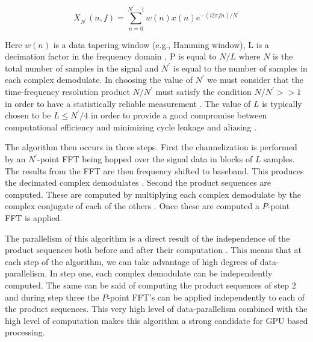 \begin{equation}
X_{N^\prime}(n,f) = \sum_{n=0}^{N^\prime - 1} w(n) x(n) e^{-(i 2 \pi f n)/N^\prime}
\label{eq:ComplexDemod}
\end{equation}

Here \begin{math}w(n)\end{math} is a data tapering window (e.g., Hamming window), L is a decimation factor in the frequency domain \cite{FenChenWan08}, P is equal to \begin{math}N / L \end{math} where $N$ is the total number of samples in the signal and $N^\prime$ is equal to the number of samples in each complex demodulate.  In choosing the value of \begin{math}N^\prime \end{math} we must consider that the time-frequency resolution product \begin{math}N/N^\prime\end{math} must satisfy the condition \begin{math}N/N^\prime >> 1\end{math} in order to have a statistically reliable measurement \cite{RobBroLoo91}.  The value of $L$ is typically chosen to be \begin{math}L \le N^\prime / 4\end{math} in order to provide a good compromise between computational efficiency and minimizing cycle leakage and aliasing \cite{RobBroLoo91}.

The algorithm then occurs in three steps.  First the channelization is performed by an $N^\prime$-point FFT being hopped over the signal data in blocks of $L$ samples.  The results from the FFT are then frequency shifted to baseband.  This produces the decimated complex demodulates \cite{RobBroLoo91}.  Second the product sequences are computed.  These are computed by multiplying each complex demodulate by the complex conjugate of each of the others \cite{Costa96}.  Once these are computed a $P$-point FFT is applied.

The parallelism of this algorithm is a direct result of the independence of the product sequences both before and after their computation \cite{RobBroLoo91}.  This means that at each step of the algorithm, we can take advantage of high degrees of data-parallelism.  In step one, each complex demodulate can be independently computed.  The same can be said of computing the product sequences of step 2 and during step three the $P$-point FFT's can be applied independently to each of the product sequences.  This very high level of data-parallelism combined with the high level of computation makes this algorithm a strong candidate for GPU based processing.


